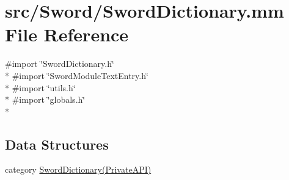 \hypertarget{_sword_dictionary_8mm}{\section{src/\-Sword/\-Sword\-Dictionary.mm File Reference}
\label{_sword_dictionary_8mm}
}
{\ttfamily \#import \char`\"{}Sword\-Dictionary.\-h\char`\"{}}\\*
{\ttfamily \#import \char`\"{}Sword\-Module\-Text\-Entry.\-h\char`\"{}}\\*
{\ttfamily \#import \char`\"{}utils.\-h\char`\"{}}\\*
{\ttfamily \#import \char`\"{}globals.\-h\char`\"{}}\\*
\subsection*{Data Structures}
\begin{DoxyCompactItemize}
\item 
category \hyperlink{category_sword_dictionary_07_private_a_p_i_08}{Sword\-Dictionary(\-Private\-A\-P\-I)}
\end{DoxyCompactItemize}
